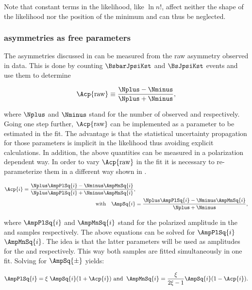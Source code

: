 \noindent Note that constant terms in the likelihood, like $\ln n!$, affect neither the shape of the likelihood nor the position of the minimum
and can thus be neglected.


\subsubsection{\CP asymmetries as free parameters}
\label{cp_assymetries_and_total_decay_rate}
The \CP asymmetries discussed in  can be measured from the raw asymmetry observed in data.
This is done by counting $\BsbarJpsiKst$ and $\BsJpsiKst$ events and use them to determine

\begin{equation}
\Acp{\text{raw}} \equiv \frac{\Nplus - \Nminus}{\Nplus + \Nminus},
\label{acp_mes}
\end{equation}

\noindent where $\Nplus$ and $\Nminus$ stand for the number of observed \BsbarJpsiKst and \BsJpsiKst respectively.
Going one step further, $\Acp{\text{raw}}$ can be implemented as a parameter to be estimated in the fit. The advantage
is that the statistical uncertainty propagation for those parameters is implicit in the likelihood thus avoiding
explicit calculations. In addition, the above quantities can be measured in a polarization dependent way. In order
to vary $\Acp{\text{raw}}$ in the fit it is necessary to re-parameterize them in a different way shown in .

\begin{align}
  \label{acp_param}
\Acp{i} = \frac{\Nplus\AmpPlSq{i} - \Nminus\AmpMnSq{i}}{\Nplus\AmpPlSq{i} + \Nminus\AmpMnSq{i} }, & \\
\text{with} \quad \AmpSq{i} &= \frac{ \Nplus \AmpPlSq{i} - \Nminus\AmpMnSq{i}}{\Nplus + \Nminus} \nonumber ,
\end{align}


\noindent where $\AmpPlSq{i}$ and $\AmpMnSq{i}$ stand for the polarized amplitude in the \BsbarJpsiKst
and \BsJpsiKst samples respectively. The above equations can be solved for $\AmpPlSq{i}$  $\AmpMnSq{i}$. The idea
is that the latter parameters will be used as amplitudes for the \BsbarJpsiKst and \BsJpsiKst \pdfs respectively.
This way both samples are fitted simultaneously in one fit. Solving  for $\AmpSq{\pm}$ yields:

\begin{equation}
\AmpPlSq{i} = \xi \; \AmpSq{i} (1+\Acp{i}) \,\, \text{and}\;\; \AmpMnSq{i} = \frac{\xi}{2\xi-1} \AmpSq{i} (1-\Acp{i}).
\label{acp_free}
\end{equation}


